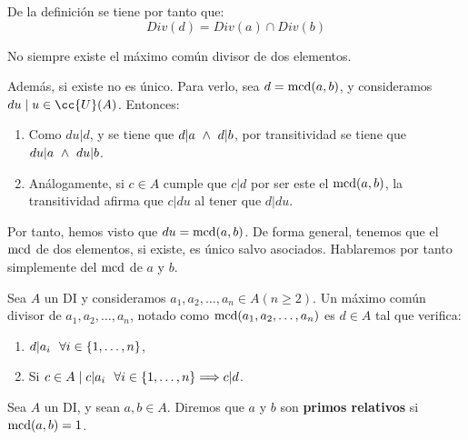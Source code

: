 De la definición se tiene por tanto que:
$$Div(d) = Div(a) \cap Div(b)$$

\begin{observacion}
    No siempre existe el máximo común divisor de dos elementos.
    
    Además, si existe no es único. Para verlo, sea $d=\operatorname{mcd}(a,b)$, y consideramos $du\mid u\in \cc{U}(A)$. Entonces:
    \begin{enumerate}
        \item Como $du|d$, y se tiene que $d|a\ \land \  d|b$, por transitividad se tiene que $du|a\ \land \  du|b$.
        \item Análogamente, si $c\in A$ cumple que $c|d$ por ser este el $\operatorname{mcd}(a,b)$, la transitividad afirma que $c|du$ al tener que $d|du$.
    \end{enumerate}

    Por tanto, hemos visto que $du=\operatorname{mcd}(a,b)$. De forma general, tenemos que el $\operatorname{mcd}$ de dos elementos, si existe, es único salvo asociados. Hablaremos por tanto simplemente del $\operatorname{mcd}$ de $a$ y $b$.
\end{observacion}

\begin{definicion}
    Sea $A$ un DI y consideramos $a_1, a_2, \ldots, a_n \in A (n \geq 2)$. Un máximo común divisor de $a_1, a_2, \ldots, a_n$, notado como $\operatorname{mcd}(a_1, a_2, \ldots, a_n)$ es $d \in A$ tal que verifica:
    \begin{enumerate}
        \item $d|a_i~~\forall i \in \{1, \ldots, n\} $,
        \item Si $c\in A \mid c|a_i~~\forall i \in \{1, \ldots, n\} \Longrightarrow c|d$.
    \end{enumerate}
\end{definicion}


\begin{definicion}
    Sea $A$ un DI, y sean $a,b \in A$. Diremos que $a$ y $b$ son \textbf{primos relativos} si $\operatorname{mcd}(a,b)=1$.
\end{definicion}

